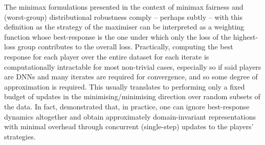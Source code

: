 %
The minimax formulations presented in the context of minimax fairness and (worst-group)
distributional robustness comply -- perhaps subtly -- with this definition as the strategy of the
maximiser can be interpreted as a weighting function whose best-response is the one under which
only the loss of the highest-loss group contributes to the overall loss. 
%
Practically, computing the best response for each player over the entire dataset for each iterate
is computationally intractable for most non-trivial cases, especially so if said players are
\acp{DNN} and many iterates are required for convergence, and so some degree of approximation is
required.
%
This usually translates to performing only a fixed budget of updates in the minimising/minimising
direction over random subsets of the data.
%
In fact, \citet{ganin2016domain} demonstrated that, in practice, one can ignore best-response
dynamics altogether and obtain approximately domain-invariant representations with minimal overhead
through concurrent (single-step) updates to the players' strategies.

